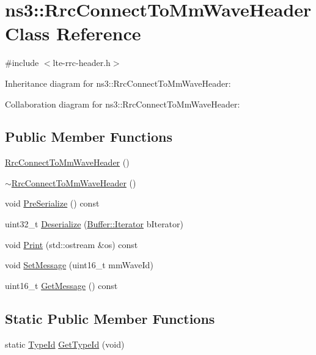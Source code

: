 \hypertarget{classns3_1_1RrcConnectToMmWaveHeader}{}\section{ns3\+:\+:Rrc\+Connect\+To\+Mm\+Wave\+Header Class Reference}
\label{classns3_1_1RrcConnectToMmWaveHeader}


{\ttfamily \#include $<$lte-\/rrc-\/header.\+h$>$}



Inheritance diagram for ns3\+:\+:Rrc\+Connect\+To\+Mm\+Wave\+Header\+:


Collaboration diagram for ns3\+:\+:Rrc\+Connect\+To\+Mm\+Wave\+Header\+:
\subsection*{Public Member Functions}
\begin{DoxyCompactItemize}
\item 
\hyperlink{classns3_1_1RrcConnectToMmWaveHeader_af186a87bbda2f36cbe6bb75aae63f515}{Rrc\+Connect\+To\+Mm\+Wave\+Header} ()
\item 
\hyperlink{classns3_1_1RrcConnectToMmWaveHeader_a84ccf87db6e1ab9635c626566da0e567}{$\sim$\+Rrc\+Connect\+To\+Mm\+Wave\+Header} ()
\item 
void \hyperlink{classns3_1_1RrcConnectToMmWaveHeader_ab294a2afebe8f3306b801dc57d4fd616}{Pre\+Serialize} () const 
\item 
uint32\+\_\+t \hyperlink{classns3_1_1RrcConnectToMmWaveHeader_a5d6bf13a33fb54a0d8c6338c1748b191}{Deserialize} (\hyperlink{classns3_1_1Buffer_1_1Iterator}{Buffer\+::\+Iterator} b\+Iterator)
\item 
void \hyperlink{classns3_1_1RrcConnectToMmWaveHeader_a5fa49e87890433b7c84b5ee604326e10}{Print} (std\+::ostream \&os) const 
\item 
void \hyperlink{classns3_1_1RrcConnectToMmWaveHeader_ac10e130a03fb0673a133d80cc39d5769}{Set\+Message} (uint16\+\_\+t mm\+Wave\+Id)
\item 
uint16\+\_\+t \hyperlink{classns3_1_1RrcConnectToMmWaveHeader_a9bd91eff833e053c498ff58db9554321}{Get\+Message} () const 
\end{DoxyCompactItemize}
\subsection*{Static Public Member Functions}
\begin{DoxyCompactItemize}
\item 
static \hyperlink{classns3_1_1TypeId}{Type\+Id} \hyperlink{classns3_1_1RrcConnectToMmWaveHeader_ab88fb03dc0c6918524459fd8ea37caae}{Get\+Type\+Id} (void)
\end{DoxyCompactItemize}
